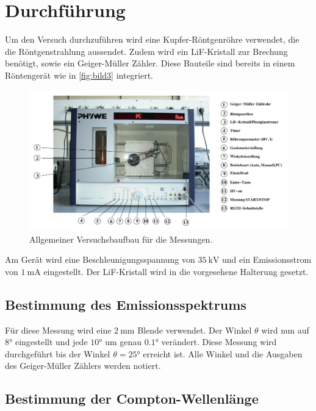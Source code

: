 \section{Durchführung}
\label{sec:durchfuehrung}

Um den Versuch durchzuführen wird eine Kupfer-Röntgenröhre verwendet, die die Röntgenstrahlung aussendet.
Zudem wird ein LiF-Kristall zur Brechung benötigt, sowie ein Geiger-Müller Zähler.
Diese Bauteile sind bereits in einem Röntengerät wie in \autoref{fig:bild3} integriert.

\begin{figure}
    \centering
    \includegraphics[width=\textwidth/2]{images/bild3.png}
    \caption{Allgemeiner Versuchsbaufbau für die Messungen. \cite{V603}}
    \label{fig:bild3}
\end{figure}

Am Gerät wird eine Beschleunigungsspannung von $\SI{35}{\kilo\volt}$ und ein Emissionsstrom von $\SI{1}{\milli\ampere}$ eingestellt.
Der LiF-Kristall wird in die vorgesehene Halterung gesetzt.

\subsection{Bestimmung des Emissionsspektrums}
\label{ssec:a}

Für diese Messung wird eine $\SI{2}{\milli\meter}$ Blende verwendet.
Der Winkel $\theta$ wird nun auf $\ang{8}$ eingestellt und jede $\ang{10}$ um genau $\ang{0.1}$ verändert.
Diese Messung wird durchgeführt bis der Winkel $\theta = \ang{25}$ erreicht ist.
Alle Winkel und die Ausgaben des Geiger-Müller Zählers werden notiert.

\subsection{Bestimmung der Compton-Wellenlänge}
\label{ssec:b}

